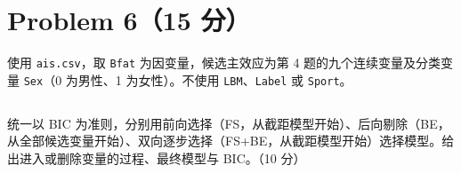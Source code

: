 \documentclass[12pt,a4paper]{article}
\begin{document}
\section{Problem 6（15 分）}

使用 \texttt{ais.csv}，取 \texttt{Bfat} 为因变量，候选主效应为第 4 题的九个连续变量及分类变量 \texttt{Sex}（0 为男性、1 为女性）。不使用 \texttt{LBM}、\texttt{Label} 或 \texttt{Sport}。

\subsection{}

统一以 BIC 为准则，分别用前向选择（FS，从截距模型开始）、后向剔除（BE，从全部候选变量开始）、双向逐步选择（FS+BE，从截距模型开始）选择模型。给出进入或删除变量的过程、最终模型与 BIC。（10 分）
\end{document}

